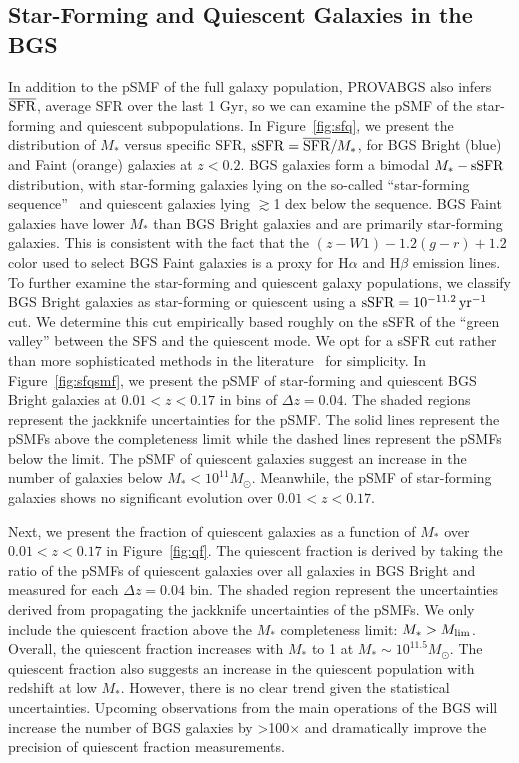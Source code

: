 \subsection{Star-Forming and Quiescent Galaxies in the BGS} \label{sec:sfq}
In addition to the pSMF of the full galaxy population, PROVABGS also infers
$\overline{\rm SFR}$, average SFR over the last 1 Gyr, so we can examine the
pSMF of the star-forming and quiescent subpopulations. 
In Figure~\ref{fig:sfq}, we present the distribution of $M_*$ versus specific
SFR, ${\rm sSFR} = \overline{\rm SFR}/M_*$, for BGS Bright (blue) and Faint
(orange) galaxies at $z < 0.2$. 
BGS galaxies form a bimodal $M_*-{\rm sSFR}$ distribution, with star-forming
galaxies lying on the so-called ``star-forming
sequence''~\citep[SFS;][]{noeske2007, daddi2007, salim2007, speagle2014,
hahn2019} and quiescent galaxies lying $\gtrsim$1 dex below the sequence. 
BGS Faint galaxies have lower $M_*$ than BGS Bright galaxies and are primarily
star-forming galaxies. 
This is consistent with the fact that the $(z - W1)-1.2(g-r)+1.2$ color used to
select BGS Faint galaxies is a proxy for H$\alpha$ and H$\beta$ emission lines.  
To further examine the star-forming and quiescent galaxy populations, we
classify BGS Bright galaxies as star-forming or quiescent using a 
${\rm sSFR} = 10^{-11.2}\,{\rm yr}^{-1}$ cut. 
We determine this cut empirically based roughly on the sSFR of the ``green
valley'' between the SFS and the quiescent mode. 
We opt for a sSFR cut rather than more sophisticated methods in the
literature~\citep[\emph{e.g.}][]{hahn2019, donnari2019} for simplicity. 
In Figure~\ref{fig:sfqsmf}, we present the pSMF of star-forming and quiescent
BGS Bright galaxies at $0.01 < z < 0.17$ in bins of $\Delta z = 0.04$.
The shaded regions represent the jackknife uncertainties for the pSMF. 
The solid lines represent the pSMFs above the completeness limit while the
dashed lines represent the pSMFs below the limit. 
The pSMF of quiescent galaxies suggest an increase in the number of galaxies
below $M_* < 10^{11}M_\odot$.
Meanwhile, the pSMF of star-forming galaxies shows no significant evolution
over $0.01 < z < 0.17$. 

Next, we present the fraction of quiescent galaxies as a function of $M_*$ over
$0.01 < z < 0.17$ in Figure~\ref{fig:qf}.
The quiescent fraction is derived by taking the ratio of the pSMFs of quiescent
galaxies over all galaxies in BGS Bright and measured for each $\Delta z =0.04$
bin.
The shaded region represent the uncertainties derived from propagating the
jackknife uncertainties of the pSMFs. 
We only include the quiescent fraction above the $M_*$ completeness limit: $M_*
> M_{\rm lim}$. 
Overall, the quiescent fraction increases with $M_*$ to 1 at
$M_*\sim10^{11.5}M_\odot$. 
The quiescent fraction also suggests an increase in the quiescent population
with redshift at low $M_*$. 
However, there is no clear trend given the statistical uncertainties.
Upcoming observations from the main operations of the BGS will increase the
number of BGS galaxies by >100$\times$ and dramatically improve the precision
of quiescent fraction measurements. 
